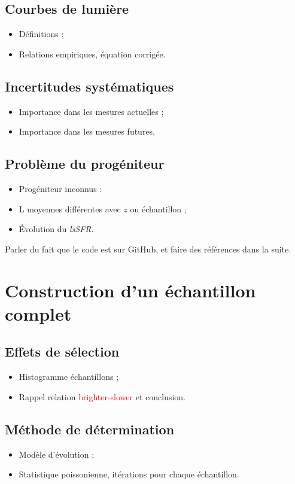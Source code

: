 \documentclass[a4paper, 12pt, svgnames]{article}
\begin{document}
\subsection{Courbes de lumière}
\begin{itemize}
    \item Définitions ;
    \item Relations empiriques, équation corrigée.
\end{itemize}

\subsection{Incertitudes systématiques}
\begin{itemize}
    \item Importance dans les mesures actuelles ;
    \item Importance dans les mesures futures.
\end{itemize}

\subsection{Problème du progéniteur}
\begin{itemize}
    \item Progéniteur inconnus :
    \item L moyennes différentes avec $z$ ou échantillon ;
    \item Évolution du \textit{lsSFR}.
\end{itemize}

Parler du fait que le code est sur GitHub, et faire des références dans la
suite.

\section{Construction d'un échantillon complet}
\subsection{Effets de sélection}
\begin{itemize}
    \item Histogramme échantillons ;
    \item Rappel relation \textcolor{red}{brighter-slower} et conclusion.
\end{itemize}

\subsection{Méthode de détermination}
\begin{itemize}
    \item Modèle d'évolution ;
    \item Statistique poissonienne, itérations pour chaque échantillon.
\end{itemize}
\end{document}
